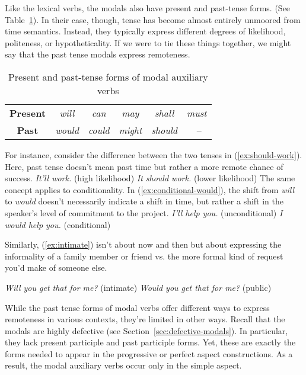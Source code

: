 Like the lexical verbs, the modals also have present and past-tense forms. (See Table~\ref{tab:modal-auxiliary-forms-tense}). In their case, though, tense has become almost entirely unmoored from time semantics. Instead, they typically express different degrees of likelihood, politeness, or hypotheticality. If we were to tie these things together, we might say that the past tense modals express remoteness.

\begin{table}[ht]
    \centering
    \begin{tabular}{cccccc}
        \textbf{Present} & \textit{will} & \textit{can} & \textit{may} & \textit{shall} & \textit{must} \\
        \textbf{Past} & \textit{would} & \textit{could} & \textit{might} & \textit{should} &~-- \\
    \end{tabular}
    \caption{Present and past-tense forms of modal auxiliary verbs}
    \label{tab:modal-auxiliary-forms-tense}
\end{table}
\noindent For instance, consider the difference between the two tenses in (\ref{ex:should-work}). Here, past tense doesn't mean past time but rather a more remote chance of success.
\ea\label{ex:should-work}
\ea \textit{It'll work.} \hfill(high likelihood)
\ex \textit{It should work.} \hfill(lower likelihood)
\z\z
The same concept applies to conditionality. In (\ref{ex:conditional-would}), the shift from \textit{will} to \textit{would} doesn't necessarily indicate a shift in time, but rather a shift in the speaker's level of commitment to the project.
\ea\label{ex:conditional-would}
\ea \textit{I'll help you.} \hfill(unconditional)
\ex \textit{I would help you.} \hfill(conditional)
\z\z

Similarly, (\ref{ex:intimate}) isn't about now and then but about expressing the informality of a family member or friend vs. the more formal kind of request you'd make of someone else.

\ea \label{ex:intimate}
\ea \textit{Will you get that for me?} \hfill(intimate)
\ex \textit{Would you get that for me?} \hfill(public)
\z
\z{}

While the past tense forms of modal verbs offer different ways to express remoteness in various contexts, they're limited in other ways. Recall that the modals are highly defective (see Section~\ref{sec:defective-modals}). In particular, they lack present participle and past participle forms. Yet, these are exactly the forms needed to appear in the progressive or perfect aspect constructions. As a result, the modal auxiliary verbs occur only in the simple aspect.

